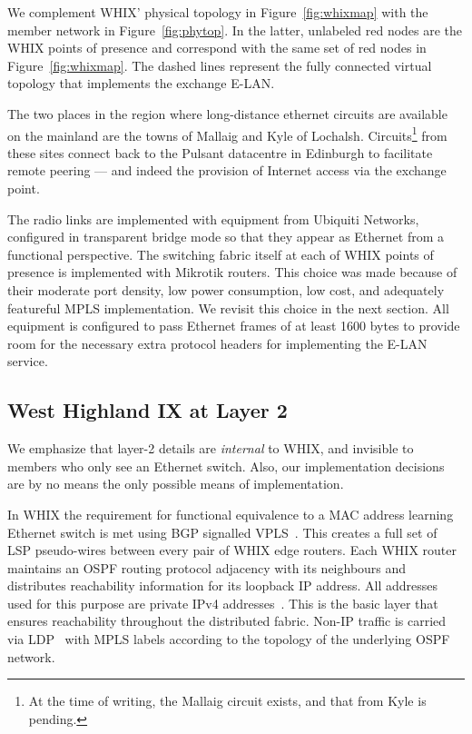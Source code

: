 We complement \ac{WHIX}' physical topology in Figure~\ref{fig:whixmap}
with the member network in Figure~\ref{fig:phytop}. In the latter,
unlabeled red nodes are the \ac{WHIX} points of presence and
correspond with the same set of red nodes in Figure~\ref{fig:whixmap}.
The dashed lines represent the fully connected virtual topology that
implements the exchange E-LAN.

The two places in the region where long-distance ethernet circuits are
available on the mainland are the towns of Mallaig and Kyle of
Lochalsh. Circuits\footnote{\small{At the time of writing, the Mallaig
circuit exists, and that from Kyle is pending.}} from these sites
connect back to the Pulsant datacentre in Edinburgh to facilitate
remote peering --- and indeed the provision of Internet access via the
exchange point.

The radio links are implemented with equipment from Ubiquiti Networks,
configured in transparent bridge mode so that they appear as Ethernet from a
functional perspective. The switching fabric itself at each of \ac{WHIX} points
of presence is implemented with Mikrotik routers. This choice was made because
of their moderate port density, low power consumption, low cost, and adequately
featureful \acs{MPLS} implementation. We revisit this choice in the next
section. All equipment is configured to pass Ethernet frames of at least 1600
bytes to provide room for the necessary extra protocol headers for implementing
the E-LAN service.

\subsection{West Highland IX at Layer 2}\label{sec:bgpvpls}

We emphasize that layer-2 details are \emph{internal} to
\ac{WHIX}, and invisible to members who only see an Ethernet switch. Also, our
implementation decisions are by no means the only possible means of
implementation.

In \ac{WHIX} the requirement for functional equivalence to a \acs{MAC} address
learning Ethernet switch is met using \acs{BGP} signalled
\acs{VPLS}~\cite{rfc4761}. This creates a full set of \acs{LSP} pseudo-wires
between every pair of \ac{WHIX} edge routers.
Each \ac{WHIX} router maintains an \acs{OSPF} routing protocol
adjacency with its neighbours and distributes reachability information
for its loopback IP address. All addresses used for this purpose are
private IPv4 addresses~\cite{rfc1918}. This is the basic layer that
ensures reachability throughout the distributed fabric.
Non-IP traffic is carried via \acs{LDP}~\cite{rfc5036}
with \acs{MPLS} labels according to the topology of the underlying \acs{OSPF}
network.

